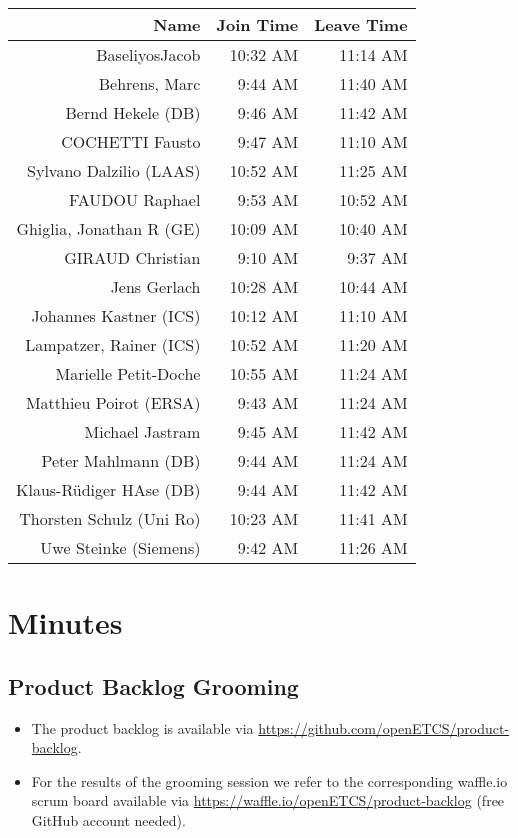 \documentclass[a4paper, 11pt]{article}
\begin{document}
\begin{table}[htbp]
    \begin{tabular}{rrr}
    \toprule
    \textbf{Name} & \textbf{Join Time} & \textbf{Leave Time} \\
    \midrule
    BaseliyosJacob & 10:32 AM & 11:14 AM  \\
    Behrens, Marc & 9:44 AM & 11:40 AM  \\
    Bernd Hekele (DB) & 9:46 AM & 11:42 AM  \\
    COCHETTI Fausto & 9:47 AM & 11:10 AM  \\
    Sylvano Dalzilio (LAAS) & 10:52 AM & 11:25 AM  \\
    FAUDOU Raphael & 9:53 AM & 10:52 AM \\
    Ghiglia, Jonathan R (GE) & 10:09 AM & 10:40 AM \\
    GIRAUD Christian & 9:10 AM & 9:37 AM  \\
    Jens Gerlach & 10:28 AM & 10:44 AM \\
    Johannes Kastner (ICS) & 10:12 AM & 11:10 AM  \\
    Lampatzer, Rainer (ICS)& 10:52 AM & 11:20 AM \\
    Marielle Petit-Doche & 10:55 AM & 11:24 AM  \\
    Matthieu Poirot (ERSA) & 9:43 AM & 11:24 AM  \\
    Michael Jastram & 9:45 AM & 11:42 AM  \\
    Peter Mahlmann (DB) & 9:44 AM & 11:24 AM  \\
    Klaus-R\"udiger HAse (DB) & 9:44 AM & 11:42 AM  \\
    Thorsten Schulz (Uni Ro) & 10:23 AM & 11:41 AM  \\
    Uwe Steinke (Siemens) & 9:42 AM & 11:26 AM  \\

     \bottomrule
    \end{tabular}%
  \label{tab:addlabel}%
\end{table}%




\section{Minutes}

\subsection{Product Backlog Grooming}
\begin{itemize}
\item The product backlog is available via 
\url{https://github.com/openETCS/product-backlog}. 
\item For the results of the grooming session we refer to the corresponding waffle.io scrum board available via \url{https://waffle.io/openETCS/product-backlog} (free GitHub account needed).
\end{itemize}
\end{document}
